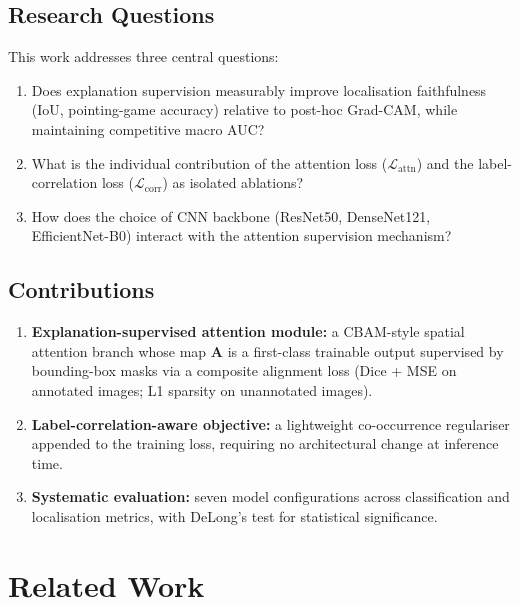 \documentclass[12pt, a4paper]{article}
\begin{document}
\subsection{Research Questions}

This work addresses three central questions:

\begin{enumerate}[label=\textbf{RQ\arabic*.}, leftmargin=2.5em]
  \item Does explanation supervision measurably improve localisation faithfulness
        (IoU, pointing-game accuracy) relative to post-hoc Grad-CAM, while maintaining
        competitive macro AUC?
  \item What is the individual contribution of the attention loss ($\mathcal{L}_{\text{attn}}$)
        and the label-correlation loss ($\mathcal{L}_{\text{corr}}$) as isolated ablations?
  \item How does the choice of CNN backbone (ResNet50, DenseNet121, EfficientNet-B0)
        interact with the attention supervision mechanism?
\end{enumerate}

\subsection{Contributions}

\begin{enumerate}[leftmargin=1.8em]
  \item \textbf{Explanation-supervised attention module:} a CBAM-style spatial attention
        branch whose map $\mathbf{A}$ is a first-class trainable output supervised by
        bounding-box masks via a composite alignment loss (Dice + MSE on annotated images;
        L1 sparsity on unannotated images).
  \item \textbf{Label-correlation-aware objective:} a lightweight co-occurrence regulariser
        appended to the training loss, requiring no architectural change at inference time.
  \item \textbf{Systematic evaluation:} seven model configurations across classification
        and localisation metrics, with DeLong's test for statistical significance.
\end{enumerate}

\section{Related Work}
\end{document}
